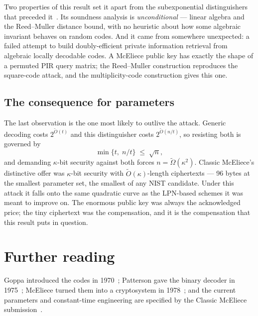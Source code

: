 Two properties of this result set it apart from the subexponential distinguishers that preceded it~\cite{ran2025,hw2025}. Its soundness analysis is \emph{unconditional} --- linear algebra and the Reed--Muller distance bound, with no heuristic about how some algebraic invariant behaves on random codes. And it came from somewhere unexpected: a failed attempt to build doubly-efficient private information retrieval from algebraic locally decodable codes. A McEliece public key has exactly the shape of a permuted PIR query matrix; the Reed--Muller construction reproduces the square-code attack, and the multiplicity-code construction gives this one.

\subsection{The consequence for parameters}

The last observation is the one most likely to outlive the attack. Generic decoding costs $2^{\tilde{O}(t)}$ and this distinguisher costs $2^{\tilde{O}(n/t)}$, so resisting both is governed by
\[
\min\{t,\; n/t\} \;\le\; \sqrt{n},
\]
and demanding $\kappa$-bit security against both forces $n = \tilde{\Omega}(\kappa^2)$. Classic McEliece's distinctive offer was $\kappa$-bit security with $\tilde{O}(\kappa)$-length ciphertexts --- 96 bytes at the smallest parameter set, the smallest of any NIST candidate. Under this attack it falls onto the same quadratic curve as the LPN-based schemes it was meant to improve on. The enormous public key was always the acknowledged price; the tiny ciphertext was the compensation, and it is the compensation that this result puts in question.

\section*{Further reading}
Goppa introduced the codes in 1970~\cite{goppa1970}; Patterson gave the binary decoder in 1975~\cite{patterson1975}; McEliece turned them into a cryptosystem in 1978~\cite{mceliece1978}; and the current parameters and constant-time engineering are specified by the Classic McEliece submission~\cite{classicmceliece}.

\printbibliography[heading=chapterrefs]
